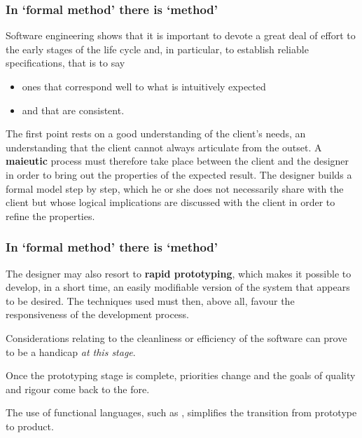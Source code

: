 \documentclass[compress,dvipdfmx]{beamer}
\begin{document}
%
\begin{frame}
  \frametitle{In `formal method' there is `method'}

  Software engineering shows that it is important to devote a
  great deal of effort to the early stages of the life cycle and, in
  particular, to establish reliable specifications, that is to say
  \begin{itemize}

    \item ones that correspond well to what is intuitively expected

    \item and that are consistent.

  \end{itemize}

  The first point rests on a good understanding of the client's needs,
  an understanding that the client cannot always articulate from the
  outset. A \textbf{maieutic} process must therefore take place
  between the client and the designer in order to bring out the
  properties of the expected result. The designer builds a formal
  model step by step, which he or she does not necessarily share with
  the client but whose logical implications are discussed with the
  client in order to refine the properties.

\end{frame}

%
\begin{frame}
  \frametitle{In `formal method' there is `method'}

  The designer may also resort to \textbf{rapid prototyping}, which
  makes it possible to develop, in a short time, an easily modifiable
  version of the system that appears to be desired. The techniques
  used must then, above all, favour the responsiveness of the
  development process.

  \bigskip

  Considerations relating to the cleanliness or efficiency of the
  software can prove to be a handicap \emph{at this stage}.

  \bigskip

  Once the prototyping stage is complete, priorities change and the
  goals of quality and rigour come back to the fore.

  \bigskip

  The use of functional languages, such as \OCaml, simplifies the
  transition from prototype to product.

\end{frame}
\end{document}
